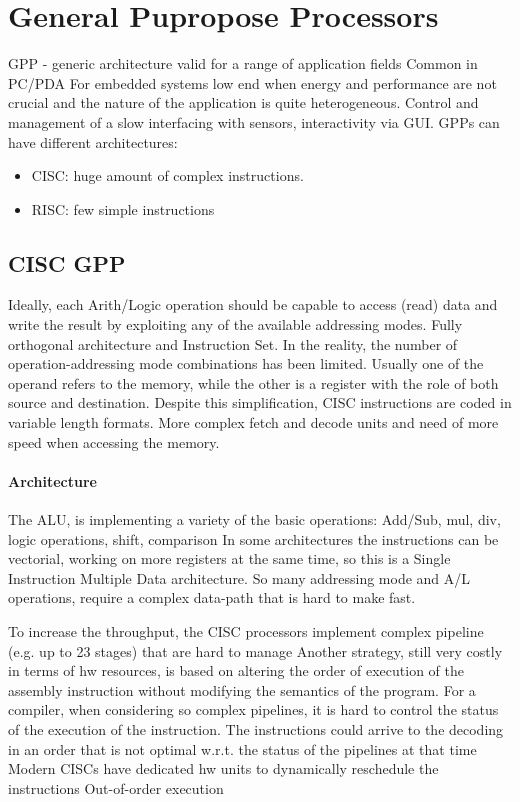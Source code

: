 \section{General Pupropose Processors}

GPP - generic architecture valid for a range of application fields
Common in PC/PDA
For embedded systems low end when energy and performance are not crucial and the nature of the application is quite heterogeneous.
Control and management of a slow interfacing with sensors, interactivity via GUI.
GPPs can have different architectures: 
\begin{itemize}
    \item CISC: huge amount of complex instructions. 
    \item RISC: few simple instructions
\end{itemize} 

\subsection{CISC GPP}
Ideally, each Arith/Logic operation should be capable to access (read) data and write the result by exploiting any of the available addressing modes.
Fully orthogonal architecture and Instruction Set.
In the reality, the number of operation-addressing mode combinations has been limited.
Usually one of the operand refers to the memory, while the other is a register with the role of both source and destination.
Despite this simplification, CISC instructions are coded in variable length formats. 
More complex fetch and decode units and need of more speed when accessing the memory.

\paragraph*{Architecture}
The ALU, is implementing a variety of the basic operations: Add/Sub, mul, div, logic operations, shift, comparison
In some architectures the instructions can be vectorial, working on more registers at the same time, so this is a Single Instruction Multiple Data architecture.
So many addressing mode and A/L operations, require a complex data-path that is hard to make fast. 

To increase the throughput, the CISC processors implement complex pipeline (e.g. up to 23 stages) that are hard to manage
Another strategy, still very costly in terms of hw resources, is based on altering the order of execution of the assembly instruction without modifying the semantics of the program.
For a compiler, when considering so complex pipelines, it is hard to control the status of the execution of the instruction.
The instructions could arrive to the decoding in an order that is not optimal w.r.t. the status of the pipelines at that time
Modern CISCs have dedicated hw units to dynamically reschedule the instructions
Out-of-order execution 

